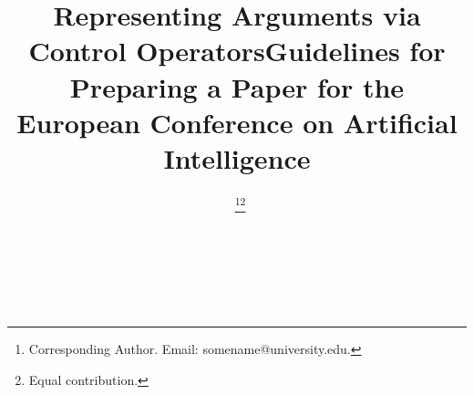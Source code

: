 \documentclass{ecai}
\title{Representing Arguments via Control Operators}
\begin{document}
\begin{ecai}
\begin{frontmatter}




\title{Guidelines for Preparing a Paper for the \\
European Conference on Artificial Intelligence}


\author[A]{~\thanks{Corresponding Author. Email: somename@university.edu.}\footnote{Equal contribution.}}
\author[B]{~\footnotemark}
\author[B,C]{~} 

\address[A]{Short Affiliation of First Author}
\address[B]{Short Affiliation of Second Author and Third Author}
\address[C]{Short Alternate Affiliation of Third Author}



\end{frontmatter}
\end{ecai}
\end{document}
